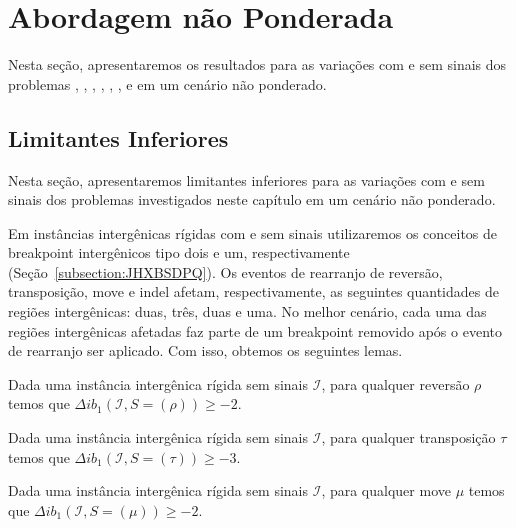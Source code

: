 \section{Abordagem não Ponderada}

Nesta seção, apresentaremos os resultados para as variações com e sem sinais dos problemas \SbIR{}, \SbIRI{}, \SbIRM{}, \SbIRMI{}, \SbIRT{}, \SbIRTI{}, \SbIRTM{} e \SbIRTMI{} em um cenário não ponderado.

\subsection{Limitantes Inferiores}

Nesta seção, apresentaremos limitantes inferiores para as variações com e sem sinais dos problemas investigados neste capítulo em um cenário não ponderado.

Em instâncias intergênicas rígidas com e sem sinais utilizaremos os conceitos de breakpoint intergênicos tipo dois e um, respectivamente (Seção~\ref{subsection:JHXBSDPQ}). Os eventos de rearranjo de reversão, transposição, move e indel afetam, respectivamente, as seguintes quantidades de regiões intergênicas: duas, três, duas e uma. No melhor cenário, cada uma das regiões intergênicas afetadas faz parte de um breakpoint removido após o evento de rearranjo ser aplicado. Com isso, obtemos os seguintes lemas.

\begin{lemma}\label{lemma:KFFPUBQG}
Dada uma instância intergênica rígida sem sinais $\mathcal{I}$, para qualquer reversão $\rho$ temos que $\Delta ib_1(\mathcal{I}, S = (\rho)) \ge -2$.
\end{lemma}

\begin{lemma}\label{lemma:IUJZCMMV}
Dada uma instância intergênica rígida sem sinais $\mathcal{I}$, para qualquer transposição $\tau$ temos que $\Delta ib_1(\mathcal{I}, S = (\tau)) \ge -3$.
\end{lemma}

\begin{lemma}\label{lemma:SYXLGTAP}
Dada uma instância intergênica rígida sem sinais $\mathcal{I}$, para qualquer move $\mu$ temos que $\Delta ib_1(\mathcal{I}, S = (\mu)) \ge -2$.
\end{lemma}

